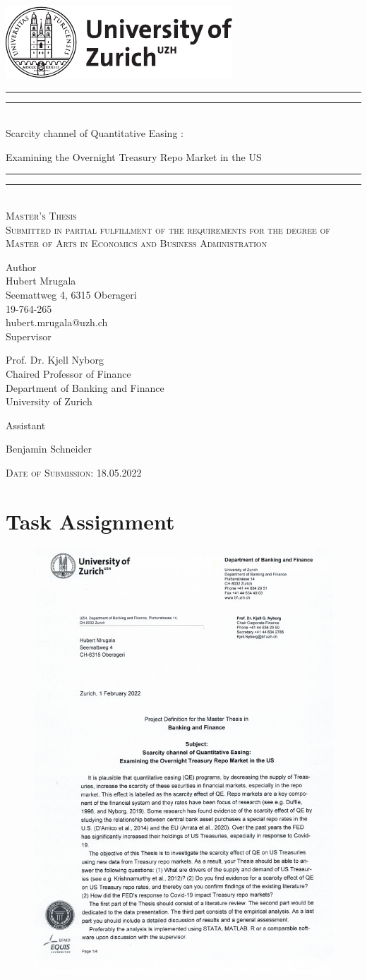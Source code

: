\documentclass[11pt,a4paper,english,oneside]{article}
\makeatletter
\newcommand*{\plogo}{\includegraphics{./style/uzh_logo_e_pos}}
\newcommand*{\titleGP}{\begingroup %
\centering %
\vspace*{\baselineskip} %
\plogo\\[2\baselineskip] %
\rule{\textwidth}{1.6pt}\vspace*{-\baselineskip}\vspace*{2pt} %
\rule{\textwidth}{0.4pt}\\[\baselineskip] %
{\LARGE Scarcity channel of Quantitative Easing :}

\vspace*{3pt}

{\LARGE Examining the Overnight Treasury Repo Market in the US}\\[0.2\baselineskip] %
\rule{\textwidth}{0.4pt}\vspace*{-\baselineskip}\vspace{3.2pt} %
\rule{\textwidth}{1.6pt}\\[2\baselineskip] %
\scshape %
Master's Thesis\\[2\baselineskip]
Submitted in partial fulfillment of the requirements for the degree of Master of Arts in Economics and Business Administration \par
\vspace*{2\baselineskip}
Author\\
{\Large Hubert Mrugala \\ [5pt]
 }
Seemattweg 4, 6315 Oberageri \\[5pt]
19-764-265 \\[5pt]
hubert.mrugala@uzh.ch \\


\vspace*{2\baselineskip}
Supervisor\\
{\Large Prof. Dr. Kjell Nyborg\\[5pt]\small Chaired Professor of Finance\\[5pt]
\small Department of Banking and Finance\\[5pt]University of Zurich\par}
\vspace*{2\baselineskip}
Assistant\\
{\Large Benjamin Schneider \par}
\vfill
{\scshape Date of Submission: 18.05.2022} \\[0.3\baselineskip]
\endgroup}
\makeatother
\begin{document}
\thispagestyle{empty}
\titleGP
\newpage
\doublespacing
\setcounter{page}{1}
\section*{Task Assignment}

\begin{figure}[h!]
  \begin{center}
    \includegraphics[page=1,width=.86\textwidth]{../../project_definition.pdf}
  \end{center}
\end{figure}
\newpage
\end{document}
